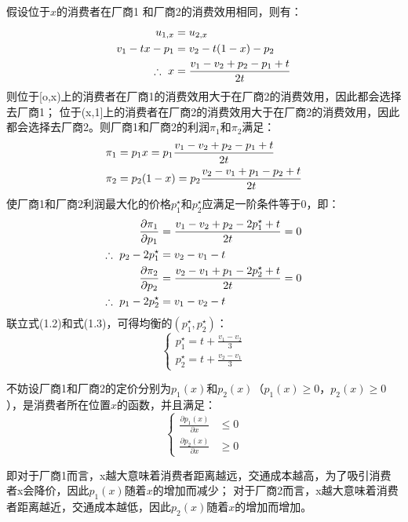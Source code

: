\question
\qpart
假设位于$x$的消费者在厂商1 和厂商2的消费效用相同，则有：
\begin{align}
     u_{1,x}&=u_{2,x} \notag \\ 
     v_1-tx-p_1 &= v_2-t(1-x)-p_2 \notag \\
     \therefore \  x &= \frac{v_1-v_2+p_2-p_1+t}{2t}
\end{align}
则位于[o,x)上的消费者在厂商1的消费效用大于在厂商2的消费效用，因此都会选择去厂商1； 位于(x,1]上的消费者在厂商2的消费效用大于在厂商2的消费效用，因此都会选择去厂商2。则厂商1和厂商2的利润$\pi_1$和$\pi_2$满足：
\begin{align}
    \pi_1 &= p_1x = p_1\frac{v_1-v_2+p_2-p_1+t}{2t}  \notag \\
    \pi_2 &= p_2(1-x) = p_2\frac{v_2-v_1+p_1-p_2+t}{2t}   \notag
\end{align}
使厂商1和厂商2利润最大化的价格$p_1^{\star}$和$p_2^{\star}$应满足一阶条件等于0，即：
\begin{align}
    \frac{\partial \pi_1 }{\partial p_1} &=\frac{v_1-v_2+p_2-2p_1^{\star}+t}{2t} = 0 \notag \\
    \therefore \ p_2-2p_1^{\star} &= v_2-v_1-t \\
    \frac{\partial \pi_2 }{\partial p_2} &=\frac{v_2-v_1+p_1-2p_2^{\star}+t}{2t} = 0 \notag \\
    \therefore \ p_1-2p_2^{\star} &= v_1-v_2-t 
\end{align}
联立式(1.2)和式(1.3)，可得均衡的$(p_1^{\star},p_2^{\star})$：
\begin{equation}
  \begin{cases}
p_1^{\star} = t+\frac{v_1-v_2}{3} \\
p_2^{\star} = t+\frac{v_2-v_1}{3}
\end{cases}  
\end{equation}

\qpart
不妨设厂商1和厂商2的定价分别为$p_1(x)$和$p_2(x)$（$p_1(x)\geq0$，$p_2(x)\geq 0$），是消费者所在位置$x$的函数，并且满足：
\begin{equation}
   \begin{cases}
    \frac{\partial p_1(x)}{\partial x}&\leq0 \\
    \frac{\partial p_2(x)}{\partial x}&\geq0
\end{cases} 
\end{equation}


即对于厂商1而言，x越大意味着消费者距离越远，交通成本越高，为了吸引消费者x会降价，因此$p_1(x)$随着$x$的增加而减少；
对于厂商2而言，x越大意味着消费者距离越近，交通成本越低，因此$p_2(x)$随着$x$的增加而增加。

